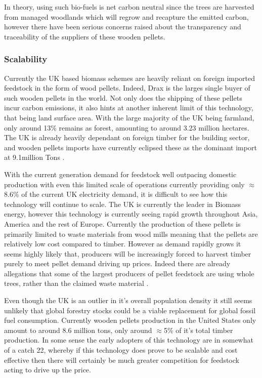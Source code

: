 \documentclass[11pt]{article}
\numberwithin{equation}{section}
\begin{document}
In theory, using such bio-fuels is net carbon neutral since the trees are harvested from managed woodlands which will regrow and recapture the emitted carbon, however there have been serious concerns raised about the transparency and traceability of the suppliers of these wooden pellets.

\subsubsection{Scalability}
\label{sec:org6fa0ccc}
Currently the UK based biomass schemes are heavily reliant on foreign imported feedstock in the form of wood pellets. Indeed, Drax is the larges single buyer of such wooden pellets in the world. Not only does the shipping of these pellets incur carbon emissions, it also hints at another inherent limit of this technology, that being land surface area. With the large majority of the UK being farmland, only around 13\% remains as forest, amounting to around 3.23 million hectares. The UK is already heavily dependant on foreign timber for the building sector, and wooden pellets imports have currently eclipsed these as the dominant import at 9.1million Tons \cite{ForestResearch}.

With the current generation demand for feedstock well outpacing domestic production with even this limited scale of operations currently providing only \(\approx\)8.6\% of the current UK electricity demand, it is difficult to see how this technology will continue to scale. The UK is currently the leader in Biomass energy, however this technology is currently seeing rapid growth throughout Asia, America and the rest of Europe. Currently the production of these pellets is primarily limited to waste materials from wood mills meaning that the pellets are relatively low cost compared to timber. However as demand rapidly grows it seems highly likely that, producers will be increasingly forced to harvest timber purely to meet pellet demand driving up prices. Indeed there are already allegations that some of the largest producers of pellet feedstock are using whole trees, rather than the claimed waste material \cite{BioPelletsWholeTrees}.

Even though the UK is an outlier in it's overall population density it still seems unlikely that global forestry stocks could be a viable replacement for global fossil fuel consumption. Currently wooden pellets production in the United States only amount to around 8.6 million tons, only around \(\approx\)5\% of it's total timber production\cite{USTimberPoduction,UNForresteryDB}. In some sense the early adopters of this technology are in somewhat of a catch 22, whereby if this technology does prove to be scalable and cost effective then there will certainly be much greater competition for feedstock acting to drive up the price.
\end{document}
